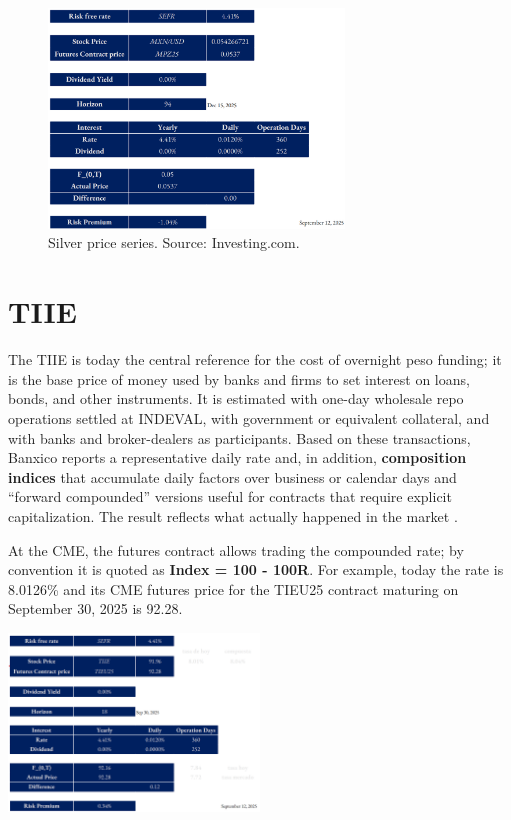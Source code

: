 \documentclass[10pt,a4paper]{article} %
\begin{document}
\begin{figure}[h]
\centering
\includegraphics[width=0.7\textwidth]{figures/usdmxn.png}
\caption{Silver price series. Source: Investing.com.}
\end{figure}



\newpage
\section{TIIE}


The TIIE is today the central reference for the cost of overnight peso funding; it is the base price of money used by banks and firms to set interest on loans, bonds, and other instruments. It is estimated with one-day wholesale repo operations settled at INDEVAL, with government or equivalent collateral, and with banks and broker-dealers as participants. Based on these transactions, Banxico reports a representative daily rate and, in addition, \textbf{composition indices} that accumulate daily factors over business or calendar days and ``forward compounded'' versions useful for contracts that require explicit capitalization. The result reflects what actually happened in the market \citep{banxico_methodology,banxico_indices}.

At the CME, the futures contract allows trading the compounded rate; by convention it is quoted as \textbf{Index = 100 - 100R}. For example, today the rate is 8.0126\% and its CME futures price for the TIEU25 contract maturing on September 30, 2025 is 92.28. 

\begin{center}
\includegraphics[width=0.5\textwidth]{figures/tiie.png}
\end{center}
\end{document}
